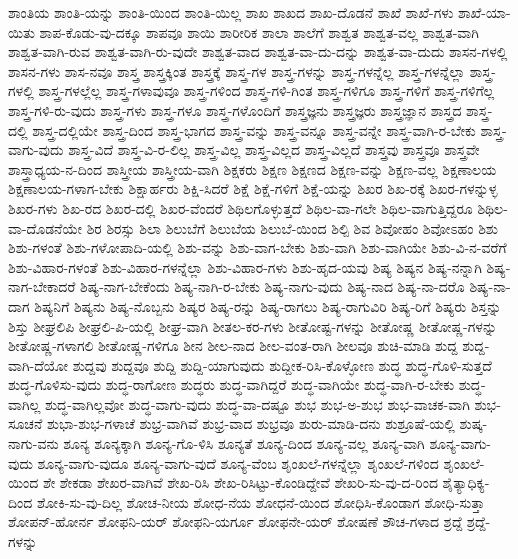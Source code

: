 {ಶಾಂತಿಯ
ಶಾಂತಿ-ಯನ್ನು
ಶಾಂತಿ-ಯಿಂದ
ಶಾಂತಿ-ಯಿಲ್ಲ
ಶಾಖ
ಶಾಖದ
ಶಾಖ-ದೊಡನೆ
ಶಾಖೆ
ಶಾಖೆ-ಗಳು
ಶಾಖೆ-ಯಾ-ಯಿತು
ಶಾಪ-ಕೊಡು-ವು-ದಕ್ಕೂ
ಶಾಪವೂ
ಶಾಯಿ
ಶಾರೀರಿಕ
ಶಾಲಾ
ಶಾಲೆಗೆ
ಶಾಶ್ವತ
ಶಾಶ್ವತ-ವಲ್ಲ
ಶಾಶ್ವತ-ವಾಗಿ
ಶಾಶ್ವತ-ವಾಗಿ-ರುವ
ಶಾಶ್ವತ-ವಾಗಿ-ರು-ವುದೇ
ಶಾಶ್ವತ-ವಾದ
ಶಾಶ್ವತ-ವಾ-ದು-ದನ್ನು
ಶಾಶ್ವತ-ವಾ-ದುದು
ಶಾಸನ-ಗಳಲ್ಲಿ
ಶಾಸನ-ಗಳು
ಶಾಸ-ನವೂ
ಶಾಸ್ತ್ರ
ಶಾಸ್ತ್ರಕ್ಕಿಂತ
ಶಾಸ್ತ್ರಕ್ಕೆ
ಶಾಸ್ತ್ರ-ಗಳ
ಶಾಸ್ತ್ರ-ಗಳನ್ನು
ಶಾಸ್ತ್ರ-ಗಳನ್ನೆಲ್ಲ
ಶಾಸ್ತ್ರ-ಗಳನ್ನೆಲ್ಲಾ
ಶಾಸ್ತ್ರ-ಗಳಲ್ಲಿ
ಶಾಸ್ತ್ರ-ಗಳಲ್ಲೆಲ್ಲ
ಶಾಸ್ತ್ರ-ಗಳಾವುವೂ
ಶಾಸ್ತ್ರ-ಗಳಿಂದ
ಶಾಸ್ತ್ರ-ಗಳಿ-ಗಿಂತ
ಶಾಸ್ತ್ರ-ಗಳಿಗೂ
ಶಾಸ್ತ್ರ-ಗಳಿಗೆ
ಶಾಸ್ತ್ರ-ಗಳಿಗೆಲ್ಲ
ಶಾಸ್ತ್ರ-ಗಳಿ-ರು-ವುದು
ಶಾಸ್ತ್ರ-ಗಳು
ಶಾಸ್ತ್ರ-ಗಳೂ
ಶಾಸ್ತ್ರ-ಗಳೊಂದಿಗೆ
ಶಾಸ್ತ್ರಜ್ಞನು
ಶಾಸ್ತ್ರಜ್ಞರು
ಶಾಸ್ತ್ರಜ್ಞಾನ
ಶಾಸ್ತ್ರದ
ಶಾಸ್ತ್ರ-ದಲ್ಲಿ
ಶಾಸ್ತ್ರ-ದಲ್ಲಿಯೇ
ಶಾಸ್ತ್ರ-ದಿಂದ
ಶಾಸ್ತ್ರ-ಭಾಗದ
ಶಾಸ್ತ್ರ-ವನ್ನು
ಶಾಸ್ತ್ರ-ವನ್ನೂ
ಶಾಸ್ತ್ರ-ವನ್ನೇ
ಶಾಸ್ತ್ರ-ವಾಗಿ-ರ-ಬೇಕು
ಶಾಸ್ತ್ರ-ವಾಗು-ವುದು
ಶಾಸ್ತ್ರ-ವಿದೆ
ಶಾಸ್ತ್ರ-ವಿ-ರ-ಲಿಲ್ಲ
ಶಾಸ್ತ್ರ-ವಿಲ್ಲ
ಶಾಸ್ತ್ರ-ವಿಲ್ಲದ
ಶಾಸ್ತ್ರ-ವಿಲ್ಲದೆ
ಶಾಸ್ತ್ರವು
ಶಾಸ್ತ್ರವೂ
ಶಾಸ್ತ್ರವೇ
ಶಾಸ್ತ್ರಾಧ್ಯಯ-ನ-ದಿಂದ
ಶಾಸ್ತ್ರೀಯ
ಶಾಸ್ತ್ರೀಯ-ವಾಗಿ
ಶಿಕ್ಷಕರು
ಶಿಕ್ಷಣ
ಶಿಕ್ಷಣದ
ಶಿಕ್ಷಣ-ವನ್ನು
ಶಿಕ್ಷಣ-ವಲ್ಲ
ಶಿಕ್ಷಣಾಲಯ
ಶಿಕ್ಷಣಾಲಯ-ಗಳಾಗ-ಬೇಕು
ಶಿಕ್ಷಾರ್ಹರು
ಶಿಕ್ಷಿ-ಸಿದರೆ
ಶಿಕ್ಷೆ
ಶಿಕ್ಷೆ-ಗಳಿಗೆ
ಶಿಕ್ಷೆ-ಯನ್ನು
ಶಿಖರ
ಶಿಖ-ರಕ್ಕೆ
ಶಿಖರ-ಗಳನ್ನುಳ್ಳ
ಶಿಖರ-ಗಳು
ಶಿಖ-ರದ
ಶಿಖರ-ದಲ್ಲಿ
ಶಿಖರ-ವೆಂದರೆ
ಶಿಥಿಲಗೊಳ್ಳುತ್ತದೆ
ಶಿಥಿಲ-ವಾ-ಗಲೇ
ಶಿಥಿಲ-ವಾಗುತ್ತಿದ್ದರೂ
ಶಿಥಿಲ-ವಾ-ದೊಡನೆಯೇ
ಶಿರ
ಶಿರಸ್ಸು
ಶಿಲಾ
ಶಿಲುಬೆಗೆ
ಶಿಲುಬೆಯ
ಶಿಲುಬೆ-ಯಿಂದ
ಶಿಲ್ಪಿ
ಶಿವ
ಶಿವೋಹಂ
ಶಿವೋಽಹಂ
ಶಿಶು
ಶಿಶು-ಗಳಂತೆ
ಶಿಶು-ಗಳೋಪಾದಿ-ಯಲ್ಲಿ
ಶಿಶು-ವನ್ನು
ಶಿಶು-ವಾಗ-ಬೇಕು
ಶಿಶು-ವಾಗಿ
ಶಿಶು-ವಾಗಿಯೇ
ಶಿಶು-ವಿ-ನ-ವರೆಗೆ
ಶಿಶು-ವಿಹಾರ-ಗಳಂತೆ
ಶಿಶು-ವಿಹಾರ-ಗಳನ್ನೆಲ್ಲಾ
ಶಿಶು-ವಿಹಾರ-ಗಳು
ಶಿಶು-ಹೃದ-ಯವು
ಶಿಷ್ಯ
ಶಿಷ್ಯನ
ಶಿಷ್ಯ-ನನ್ನಾಗಿ
ಶಿಷ್ಯ-ನಾಗ-ಬೇಕಾದರೆ
ಶಿಷ್ಯ-ನಾಗ-ಬೇಕೆಂದು
ಶಿಷ್ಯ-ನಾಗಿ-ರ-ಬೇಕು
ಶಿಷ್ಯ-ನಾಗು-ವುದು
ಶಿಷ್ಯ-ನಾದ
ಶಿಷ್ಯ-ನಾ-ದರೊ
ಶಿಷ್ಯ-ನಾ-ದಾಗ
ಶಿಷ್ಯನಿಗೆ
ಶಿಷ್ಯನು
ಶಿಷ್ಯ-ನೊಬ್ಬನು
ಶಿಷ್ಯರ
ಶಿಷ್ಯ-ರನ್ನು
ಶಿಷ್ಯ-ರಾಗಲು
ಶಿಷ್ಯ-ರಾಗುವಿರಿ
ಶಿಷ್ಯ-ರಿಗೆ
ಶಿಷ್ಯರು
ಶಿಸ್ತನ್ನು
ಶಿಸ್ತು
ಶೀಘ್ರಲಿಪಿ
ಶೀಘ್ರಲಿ-ಪಿ-ಯಲ್ಲಿ
ಶೀಘ್ರ-ವಾಗಿ
ಶೀತಲ-ಕರ-ಗಳು
ಶೀತೋಷ್ಟ-ಗಳನ್ನು
ಶೀತೋಷ್ಣ
ಶೀತೋಷ್ಣ-ಗಳನ್ನು
ಶೀತೋಷ್ಣ-ಗಳಾಗಲಿ
ಶೀತೋಷ್ಣ-ಗಳಿಗೂ
ಶೀನ
ಶೀಲ-ನಾದ
ಶೀಲ-ವಂತ-ರಾಗಿ
ಶೀಲವೂ
ಶುಚಿ-ಮಾಡಿ
ಶುದ್ದ
ಶುದ್ದ-ವಾಗಿ-ದೆಯೋ
ಶುದ್ದವು
ಶುದ್ದವೂ
ಶುದ್ದಿ
ಶುದ್ದಿ-ಯಾಗುವುದು
ಶುದ್ದೀಕ-ರಿಸಿ-ಕೊಳ್ಳೋಣ
ಶುದ್ಧ
ಶುದ್ಧ-ಗೊಳಿ-ಸುತ್ತದೆ
ಶುದ್ಧ-ಗೊಳಿಸು-ವುದು
ಶುದ್ಧ-ರಾಗೋಣ
ಶುದ್ಧರು
ಶುದ್ಧ-ವಾಗಿದ್ದರೆ
ಶುದ್ಧ-ವಾಗಿಯೇ
ಶುದ್ಧ-ವಾಗಿ-ರ-ಬೇಕು
ಶುದ್ಧ-ವಾಗಿಲ್ಲ
ಶುದ್ಧ-ವಾಗಿಲ್ಲವೋ
ಶುದ್ಧ-ವಾಗು-ವುದು
ಶುದ್ಧ-ವಾ-ದಷ್ಟೂ
ಶುಭ
ಶುಭ-ಅ-ಶುಭ
ಶುಭ-ವಾಚಕ-ವಾಗಿ
ಶುಭ-ಸೂಚನೆ
ಶುಭಾ-ಶುಭ-ಗಳಾಚೆ
ಶುಭ್ರ-ವಾಗಿವೆ
ಶುಭ್ರ-ವಾದ
ಶುಭ್ರವೂ
ಶುರು-ಮಾಡಿ-ದನು
ಶುಶ್ರೂಷೆ-ಯಲ್ಲಿ
ಶುಷ್ಕ-ನಾಗು-ವನು
ಶೂನ್ಯ
ಶೂನ್ಯಕ್ಕಾಗಿ
ಶೂನ್ಯ-ಗೊ-ಳಿಸಿ
ಶೂನ್ಯತೆ
ಶೂನ್ಯ-ದಿಂದ
ಶೂನ್ಯ-ವಲ್ಲ
ಶೂನ್ಯ-ವಾಗಿ
ಶೂನ್ಯ-ವಾಗು-ವುದು
ಶೂನ್ಯ-ವಾಗು-ವುದೂ
ಶೂನ್ಯ-ವಾಗು-ವುದೆ
ಶೂನ್ಯ-ವೆಂಬ
ಶೃಂಖಲೆ-ಗಳನ್ನೆಲ್ಲಾ
ಶೃಂಖಲೆ-ಗಳಿಂದ
ಶೃಂಖಲೆ-ಯಿಂದ
ಶೇ
ಶೇಕಡಾ
ಶೇಖರ-ವಾಗಿವೆ
ಶೇಖ-ರಿಸಿ
ಶೇಖ-ರಿಸಿಟ್ಟು-ಕೊಂಡಿದ್ದೇವೆ
ಶೇಖರಿ-ಸು-ವು-ದ-ರಿಂದ
ಶೈತ್ಯಾಧಿಕ್ಯ-ದಿಂದ
ಶೋಕಿ-ಸು-ವು-ದಿಲ್ಲ
ಶೋಚ-ನೀಯ
ಶೋಧ-ನೆಯ
ಶೋಧನೆ-ಯಿಂದ
ಶೋಧಿಸಿ-ಕೊಂಡಾಗ
ಶೋಧಿ-ಸುತ್ತಾ
ಶೋಪನ್-ಹೋರ್ನ
ಶೋಫನಿ-ಯರ್
ಶೋಫನಿ-ಯರ್ಗೂ
ಶೋಫನೇ-ಯರ್
ಶೋಷಣೆ
ಶೌಚ-ಗಳಾದ
ಶ್ರದ್ದೆ
ಶ್ರದ್ದೆ-ಗಳನ್ನು
}
